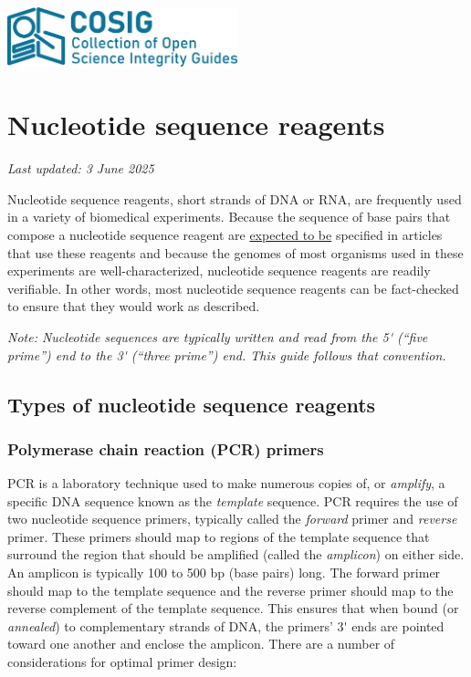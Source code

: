 \documentclass[letterpaper, 12pt]{article}
\begin{document}
\flushleft
\includegraphics[width=0.5\textwidth]{img/home/241017_final_logo_mockup.png}

\section*{Nucleotide sequence reagents}
\textit{Last updated: 3 June 2025}

Nucleotide sequence reagents, short strands of DNA or RNA, are frequently used in a variety of biomedical experiments. Because the sequence of base pairs that compose a nucleotide sequence reagent are \href{https://doi.org/10.1373/clinchem.2008.112797}{expected to be} specified in articles that use these reagents and because the genomes of most organisms used in these experiments are well-characterized, nucleotide sequence reagents are readily verifiable. In other words, most nucleotide sequence reagents can be fact-checked to ensure that they would work as described.

\textit{Note: Nucleotide sequences are typically written and read from the 5\'{} (``five prime'') end to the 3\'{} (``three prime'') end. This guide follows that convention.}

\subsection*{Types of nucleotide sequence reagents}

\subsubsection*{Polymerase chain reaction (PCR) primers}

PCR is a laboratory technique used to make numerous copies of, or \emph{amplify}, a specific DNA sequence known as the \emph{template} sequence. PCR requires the use of two nucleotide sequence primers, typically called the \emph{forward} primer and \emph{reverse} primer. These primers should map to regions of the template sequence that surround the region that should be amplified (called the \emph{amplicon}) on either side. An amplicon is typically 100 to 500 bp (base pairs) long. The forward primer should map to the template sequence and the reverse primer should map to the reverse complement of the template sequence. This ensures that when bound (or \emph{annealed}) to complementary strands of DNA, the primers' 3\'{} ends are pointed toward one another and enclose the amplicon. There are a number of considerations for optimal primer design:
\end{document}
